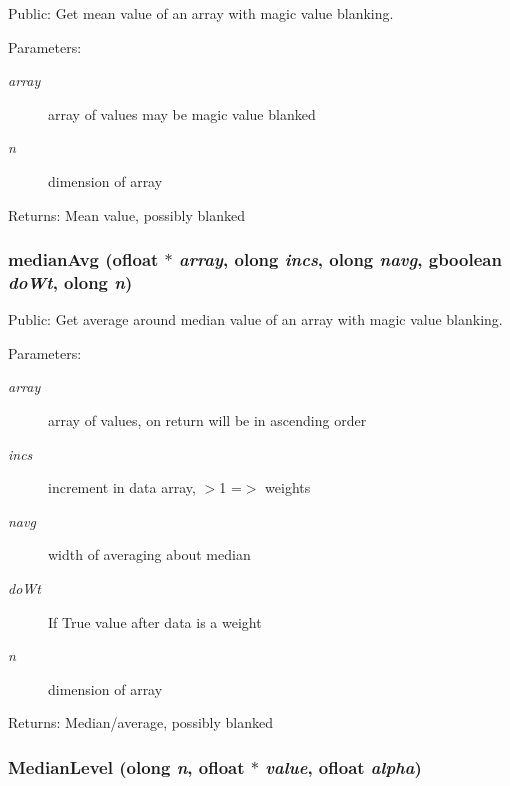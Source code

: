Public: Get mean value of an array with magic value blanking. 

\begin{Desc}
\item[Parameters:]
\begin{description}
\item[{\em array}]array of values may be magic value blanked \item[{\em n}]dimension of array \end{description}
\end{Desc}
\begin{Desc}
\item[Returns:]Mean value, possibly blanked \end{Desc}
\subsubsection{ median\-Avg ({\bf ofloat} $\ast$ {\em array}, {\bf olong} {\em incs}, {\bf olong} {\em navg}, gboolean {\em do\-Wt}, {\bf olong} {\em n})}\label{ObitUtil_8h_a2}


Public: Get average around median value of an array with magic value blanking. 

\begin{Desc}
\item[Parameters:]
\begin{description}
\item[{\em array}]array of values, on return will be in ascending order \item[{\em incs}]increment in data array, $>$1 =$>$ weights \item[{\em navg}]width of averaging about median \item[{\em do\-Wt}]If True value after data is a weight \item[{\em n}]dimension of array \end{description}
\end{Desc}
\begin{Desc}
\item[Returns:]Median/average, possibly blanked \end{Desc}
\subsubsection{ Median\-Level ({\bf olong} {\em n}, {\bf ofloat} $\ast$ {\em value}, {\bf ofloat} {\em alpha})}\label{ObitUtil_8h_a4}



